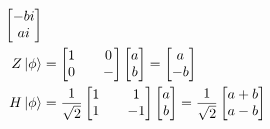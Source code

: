 \begin{align*}
\begin{bmatrix}
        -bi \\
        ai
    \end{bmatrix}                                        %
    \\
    Z\ket{\phi} & =\begin{bmatrix}
        1 &  & 0 \\
        0 &  & -
    \end{bmatrix}\begin{bmatrix}
        a \\
        b
    \end{bmatrix}=\begin{bmatrix}
        a \\
        -b
    \end{bmatrix}                                     %
    \\
    H\ket{\phi} & =\frac{1}{\sqrt{2}}\begin{bmatrix}
        1 &  & 1  \\
        1 &  & -1
    \end{bmatrix}\begin{bmatrix}
        a \\
        b
    \end{bmatrix}=\frac{1}{\sqrt{2}}\begin{bmatrix}
        a+b \\
        a-b
    \end{bmatrix} %
\end{align*}

